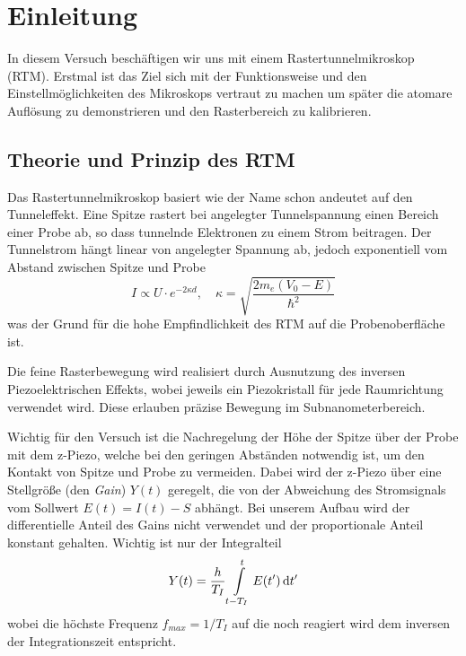 \tableofcontents
\newpage
\listoffigures

\listoftables

\skippage

\setcounter{page}{1}
\restoregeometry
\thispagestyle{fancy}


\section{Einleitung}

In diesem Versuch beschäftigen wir uns mit einem Rastertunnelmikroskop (RTM). Erstmal ist das Ziel sich mit der Funktionsweise und den Einstellmöglichkeiten des Mikroskops vertraut zu machen um später die atomare Auflösung zu demonstrieren und den Rasterbereich zu kalibrieren.

\subsection{Theorie und Prinzip des RTM}

Das Rastertunnelmikroskop basiert wie der Name schon andeutet auf den Tunneleffekt. Eine Spitze rastert bei angelegter Tunnelspannung einen Bereich einer Probe ab, so dass tunnelnde Elektronen zu einem Strom beitragen. Der Tunnelstrom hängt linear von angelegter Spannung ab, jedoch exponentiell vom Abstand zwischen Spitze und Probe
\begin{equation}
	I \propto U \cdot e^{-2 \kappa d}, \quad \kappa = \sqrt{ \frac{2m_e (V_0 - E)}{\hbar^2} }
\end{equation}
was der Grund für die hohe Empfindlichkeit des RTM auf die Probenoberfläche ist.

Die feine Rasterbewegung wird realisiert durch Ausnutzung des inversen Piezoelektrischen Effekts, wobei jeweils ein Piezokristall für jede Raumrichtung verwendet wird. Diese erlauben präzise Bewegung im Subnanometerbereich.

Wichtig für den Versuch ist die Nachregelung der Höhe der Spitze über der Probe mit dem z-Piezo, welche bei den geringen Abständen notwendig ist, um den Kontakt von Spitze und Probe zu vermeiden. Dabei wird der z-Piezo über eine Stellgröße (den \emph{Gain}) $Y(t)$ geregelt, die von der Abweichung des Stromsignals vom Sollwert $E(t)=I(t)-S$ abhängt. Bei unserem Aufbau wird der differentielle Anteil des Gains nicht verwendet und der proportionale Anteil konstant gehalten. Wichtig ist nur der Integralteil
\begin{equation}
	Y(t) = \frac{h}{T_I} \int\limits_{t-T_I}^{t} E(t^\prime) \, \mathrm{d} t^\prime
\end{equation}
wobei die höchste Frequenz $f_{max} = 1/T_I$ auf die noch reagiert wird dem inversen der Integrationszeit entspricht. 

